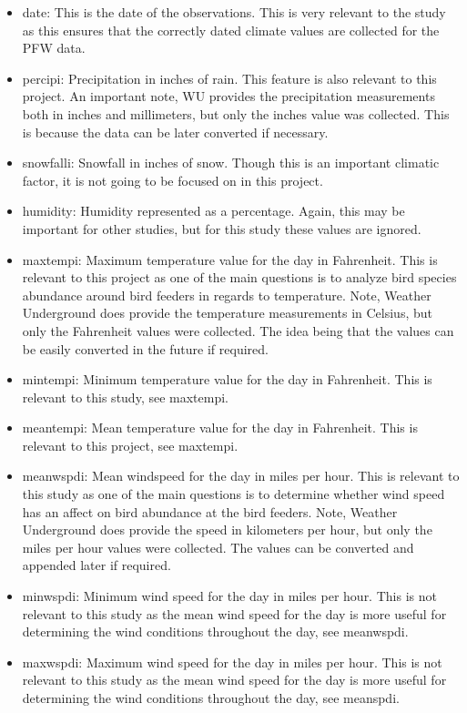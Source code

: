 \begin{itemize}

  \item date: This is the date of the observations. This is very relevant to the study as this ensures that the correctly dated climate values are collected for the PFW data.
  
  \item percipi: Precipitation in inches of rain. This feature is also relevant to this project. An important note, WU provides the precipitation measurements both in inches and millimeters, but only the inches value was collected. This is because the data can be later converted if necessary.
  
  \item snowfalli: Snowfall in inches of snow. Though this is an important climatic factor, it is not going to be focused on in this project.
  
  \item humidity: Humidity represented as a percentage. Again, this may be important for other studies, but for this study these values are ignored.
  
  \item maxtempi: Maximum temperature value for the day in Fahrenheit. This is relevant to this project as one of the main questions is to analyze bird species abundance around bird feeders in regards to temperature. Note, Weather Underground does provide the temperature measurements in Celsius, but only the Fahrenheit values were collected. The idea being that the values can be easily converted in the future if required.  
  
  \item mintempi: Minimum temperature value for the day in Fahrenheit. This is relevant to this study, see maxtempi.
  
  \item meantempi: Mean temperature value for the day in Fahrenheit. This is relevant to this project, see maxtempi.
  
  \item meanwspdi: Mean windspeed for the day in miles per hour. This is relevant to this study as one of the main questions is to determine whether wind speed has an affect on bird abundance at the bird feeders. Note, Weather Underground does provide the speed in kilometers per hour, but only the miles per hour values were collected. The values can be converted and appended later if required.
  
  \item minwspdi: Minimum wind speed for the day in miles per hour. This is not relevant to this study as the mean wind speed for the day is more useful for determining the wind conditions throughout the day, see meanwspdi.
  
  \item maxwspdi: Maximum wind speed for the day in miles per hour. This is not relevant to this study as the mean wind speed for the day is more useful for determining the wind conditions throughout the day, see meanspdi.
  
\end{itemize}

